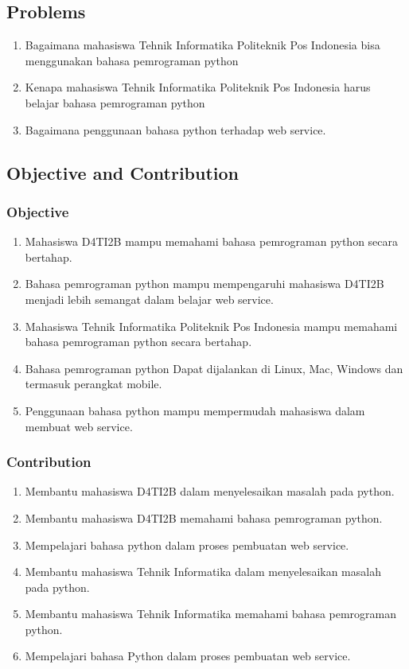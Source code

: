 \begin{enumerate}
\subsection{Problems}
	\begin{enumerate}
		\item Bagaimana mahasiswa Tehnik Informatika Politeknik Pos Indonesia bisa menggunakan bahasa pemrograman python
		\item Kenapa mahasiswa Tehnik Informatika Politeknik Pos Indonesia harus belajar bahasa pemrograman python

		\item Bagaimana penggunaan bahasa python terhadap web service.
	\end{enumerate}
	
\subsection{Objective and Contribution}
	\subsubsection{Objective}
		\begin{enumerate}

			\item Mahasiswa D4TI2B mampu memahami bahasa pemrograman python secara bertahap.
			\item Bahasa pemrograman python mampu mempengaruhi mahasiswa D4TI2B menjadi lebih semangat dalam belajar web service.

			\item Mahasiswa Tehnik Informatika Politeknik Pos Indonesia mampu memahami bahasa pemrograman python secara bertahap.
			\item Bahasa pemrograman python Dapat dijalankan di Linux, Mac, Windows dan termasuk perangkat mobile.

			\item Penggunaan bahasa python mampu mempermudah mahasiswa dalam membuat web service.
		\end{enumerate}
	\subsubsection{Contribution}
		\begin{enumerate}
			\item Membantu mahasiswa D4TI2B dalam menyelesaikan masalah pada python.
			\item Membantu mahasiswa D4TI2B memahami bahasa pemrograman python.
			\item Mempelajari bahasa python dalam proses pembuatan web service.
			\item Membantu mahasiswa Tehnik Informatika dalam menyelesaikan masalah pada python.
			\item Membantu mahasiswa Tehnik Informatika memahami bahasa pemrograman python.
			\item Mempelajari bahasa Python dalam proses pembuatan web service.
		\end{enumerate}
		

\end{enumerate}

